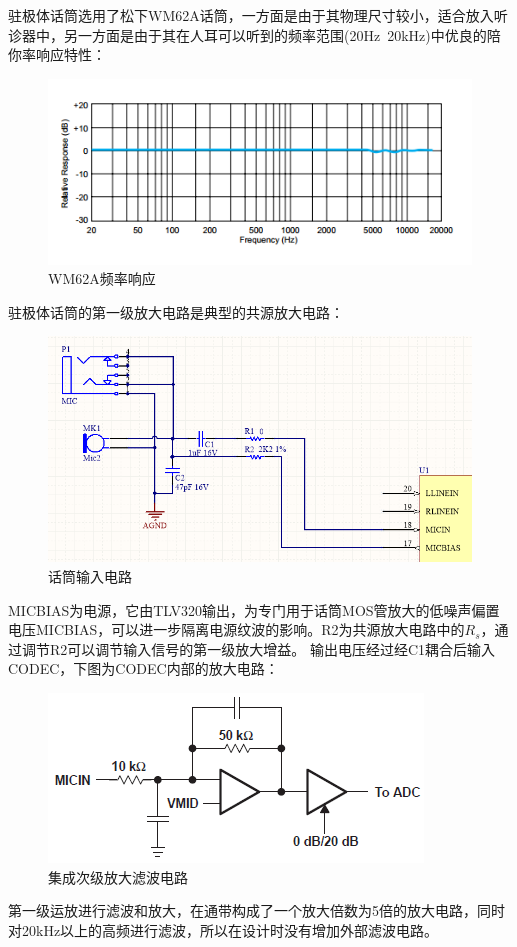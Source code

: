 \documentclass[16pt,a4paper]{article}
\begin{document}
驻极体话筒选用了松下WM62A话筒，一方面是由于其物理尺寸较小，适合放入听诊器中，另一方面是由于其在人耳可以听到的频率范围(20Hz~20kHz)中优良的陪你率响应特性：

\begin{figure}[H]
\centering
\includegraphics[scale = 1]{MICFR.png}
\caption{WM62A频率响应} 
\end{figure}

驻极体话筒的第一级放大电路是典型的共源放大电路：

\begin{figure}[H]
\centering
\includegraphics[scale = 0.8]{Mic2.png}
\caption{话筒输入电路} 
\end{figure}

MICBIAS为电源，它由TLV320输出，为专门用于话筒MOS管放大的低噪声偏置电压MICBIAS，可以进一步隔离电源纹波的影响。R2为共源放大电路中的$R_{s}$，通过调节R2可以调节输入信号的第一级放大增益。
输出电压经过经C1耦合后输入CODEC，下图为CODEC内部的放大电路：
\begin{figure}[H]
\centering
\includegraphics[scale = 1]{Mic1.png}
\caption{集成次级放大滤波电路} 
\end{figure}
第一级运放进行滤波和放大，在通带构成了一个放大倍数为5倍的放大电路，同时对20kHz以上的高频进行滤波，所以在设计时没有增加外部滤波电路。
\end{document}
